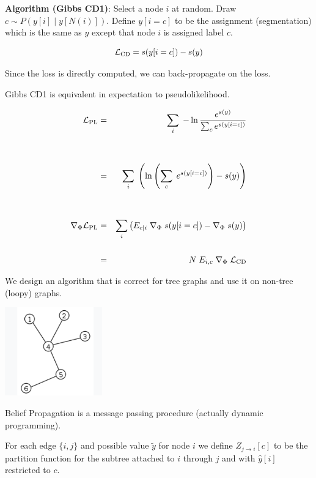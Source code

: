 {\vfill
{\bf Algorithm (Gibbs CD1)}: Select a node $i$ at random. Draw {\color{red} $c \sim P(y[i]\;| \;y[N(i)])$}. Define {\color{red} $y[i=c]$}
to be the assignment (segmentation) which is the same as $y$ except that node $i$ is assigned label $c$.

\vfill
{\color{red} $${\cal L}_{\mathrm{CD}}  = s(y[i=c]) - s(y)$$}

Since the loss is directly computed, we can back-propagate on the loss.


Gibbs CD1 is equivalent in expectation to pseudolikelihood.

{\huge
\begin{eqnarray*}
{\cal L}_{\mathrm{PL}} & = & \sum_i \; - \ln \frac{e^{s(y)}}{\sum_c e^{s(y[i=c])}} \\
\\
\\
& = & \sum_i\; \left(\ln \left(\sum_c \;e^{s(y[i=c])}\right) - s(y)\right) \\
\\
\\
\nabla_\Phi {\cal L}_{\mathrm{PL}} & = & \sum_i \left(E_{c|i}\; \nabla_\Phi\;s(y[i=c]) - \nabla_\Phi\; s(y)\right) \\
\\
& = & N \;E_{i,c}\; \nabla_\Phi \; {\cal L}_{\mathrm{CD}}
\end{eqnarray*}
}


We design an algorithm that is correct for tree graphs and use it on non-tree (loopy) graphs.


\centerline{\includegraphics[height=1.5in]{../images/Tree}}

\vfill
Belief Propagation is a message passing procedure (actually dynamic programming).

\vfill
For each edge $\{i,j\}$ and possible value $\tilde{y}$ for node $i$ we define {\color{red} $Z_{j \rightarrow i}[c]$}
to be  the partition function for the subtree attached to $i$ through $j$ and
with $\hat{y}[i]$ restricted to $c$.

}
